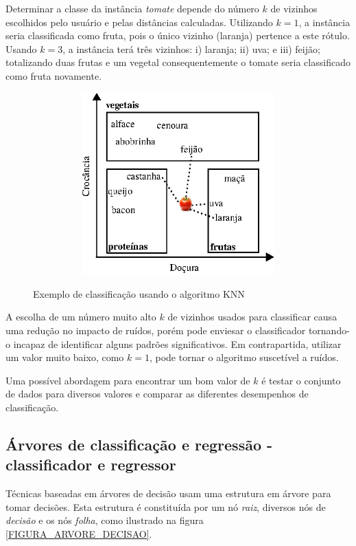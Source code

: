 Determinar a classe da instância \emph{tomate} depende do número \(k\) de vizinhos escolhidos pelo usuário e pelas distâncias calculadas. Utilizando \(k = 1\), a instância seria classificada como fruta, pois o único vizinho (laranja) pertence a este rótulo. Usando \(k = 3\), a instância terá três vizinhos: i) laranja; ii) uva; e iii) feijão; totalizando duas frutas e um vegetal consequentemente o tomate seria classificado como fruta novamente.
\begin{figure}[hbt]
	\centering
 	  \caption{Exemplo de classificação usando o algoritmo KNN}
		\includegraphics[width=12cm, height=7cm]{./secoes/conceitosFundamentais/pics/img/Tomate.eps}
	\label{FIGURA_KNN}
\end{figure}

A escolha de um número muito alto \(k\) de vizinhos usados para classificar causa uma redução no impacto de ruídos, porém pode enviesar o classificador tornando-o incapaz de identificar alguns padrões significativos. Em contrapartida, utilizar um valor muito baixo, como \(k = 1\), pode tornar o algoritmo suscetível a ruídos.

Uma possível abordagem para encontrar um bom valor de \(k\) é testar o conjunto de dados para diversos valores e comparar as diferentes desempenhos de classificação.

\subsection{Árvores de classificação e regressão - classificador e regressor}\label{SUBSECTION_CART}
Técnicas baseadas em árvores de decisão usam uma estrutura em árvore para tomar decisões. Esta estrutura é constituída por um nó \emph{raiz}, diversos nós de \emph{decisão} e os nós \emph{folha}, como ilustrado na figura \ref{FIGURA_ARVORE_DECISAO}. 

